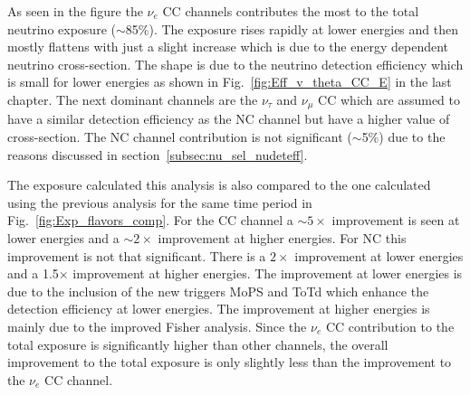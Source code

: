 As seen in the figure the $\nu_e$ CC channels contributes the most to the total neutrino exposure ($\sim$85\%). The exposure rises rapidly at lower energies and then mostly flattens with just a slight increase which is due to the energy dependent neutrino cross-section. The shape is due to the neutrino detection efficiency which is small for lower energies as shown in Fig.~\ref{fig:Eff_v_theta_CC_E} in the last chapter. The next dominant channels are the $\nu_{\tau}$ and $\nu_{\mu}$ CC which are assumed to have a similar detection efficiency as the NC channel but have a higher value of cross-section. The NC channel contribution is not significant ($\sim$5\%) due to the reasons discussed in section~\ref{subsec:nu_sel_nudeteff}.  

The exposure calculated this analysis is also compared to the one calculated using the previous analysis for the same time period in Fig.~\ref{fig:Exp_flavors_comp}. For the CC channel a $\sim 5 \times$ improvement is seen at lower energies and a $\sim 2\times$ improvement at higher energies. For NC this improvement is not that significant. There is a $2\times$ improvement at lower energies and a 1.5$\times$ improvement at higher energies. The improvement at lower energies is due to the inclusion of the new triggers MoPS and ToTd which enhance the detection efficiency at lower energies. The improvement at higher energies is mainly due to the improved Fisher analysis. Since the $\nu_e$ CC contribution to the total exposure is significantly higher than other channels, the overall improvement to the total exposure is only slightly less than the improvement to the $\nu_e$ CC channel. 

